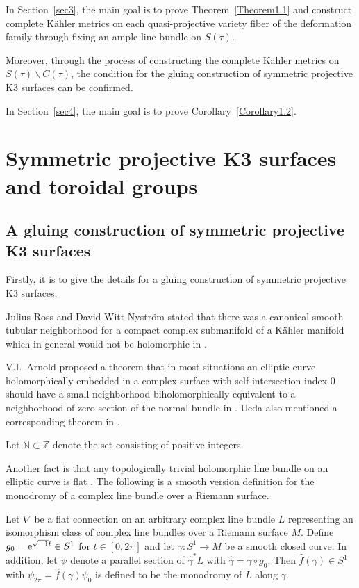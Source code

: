 \documentclass[pdftex]{sigma}
\numberwithin{equation}{section}
\begin{document}
In Section~\ref{sec3}, the main goal is to prove Theorem~\ref{Theorem1.1} and construct complete K\"ahler metrics on each quasi-projective variety fiber of the deformation family through fixing an ample line bundle on $S(\tau)$.

Moreover, through the process of constructing the complete K\"ahler metrics on $S(\tau)\backslash C(\tau)$, the condition for the gluing construction of symmetric projective K3 surfaces can be confirmed.

In Section~\ref{sec4}, the main goal is to prove Corollary~\ref{Corollary1.2}.

\section{Symmetric projective K3 surfaces and toroidal groups}\label{sec2}

\subsection{A gluing construction of symmetric projective K3 surfaces}

Firstly, it is to give the details for a gluing construction of symmetric projective K3 surfaces.

Julius Ross and David Witt Nystr\"om stated that there was a canonical smooth tubular neighborhood for a compact complex submanifold of a K\"ahler manifold which in general would not be holomorphic in \cite{Julius-David}.

V.I.~Arnold proposed a theorem that in most situations an elliptic curve holomorphically embedded in a complex surface with self-intersection index 0 should have a small neighborhood biholomorphically equivalent to a neighborhood of zero section of the normal bundle in \cite{Vladimir}. Ueda also mentioned a corresponding theorem in \cite{Tetsuo}.

Let $\mathbb{N} \subset \mathbb{Z} $ denote the set consisting of positive integers.

Another fact is that any topologically trivial holomorphic line bundle on an elliptic curve is flat \cite{Tetsuo}. The following is a smooth version definition for the monodromy of a complex line bundle over a Riemann surface.

\begin{Definition} \label{Definition2.1}
Let $\nabla$ be a flat connection on an arbitrary complex line bundle $L$ representing an isomorphism class of complex line bundles over a Riemann surface $M$. Define $g_0={\rm e}^{\sqrt{-1} t}\in S^1$ for $t\in [0,2 \pi ]$ and let $\gamma \colon S^1\to M$ be a smooth closed curve. In addition, let $\psi$ denote a parallel section of $\widehat{\gamma}^*L$ with $\widehat{\gamma}=\gamma \circ g_0 $. Then $\widehat{f}(\gamma)\in S^1$ with $\psi_{2\pi} =\widehat{f}(\gamma)\psi_0$ is defined to be the monodromy of $L$ along $\gamma$.
\end{Definition}
\end{document}
